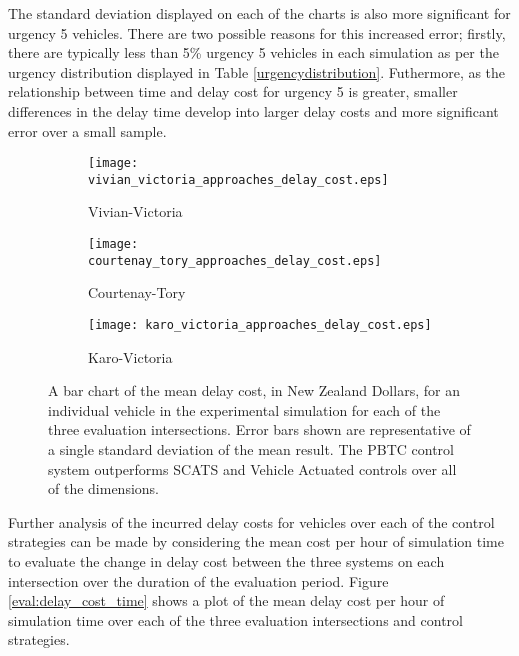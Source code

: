  The standard deviation displayed on each of the charts is also more significant for urgency 5 vehicles. There are two possible reasons for this increased error; firstly, there are typically less than 5\% urgency 5 vehicles in each simulation as per the urgency distribution displayed in Table \ref{urgencydistribution}. Futhermore, as the relationship between time and delay cost for urgency 5 is greater, smaller differences in the delay time develop into larger delay costs and more significant error over a small sample.
 
\begin{figure}
\centering
\begin{subfigure}{.5\textwidth}
  \centering
  \texttt{[image: vivian\_victoria\_approaches\_delay\_cost.eps]}
  \caption{Vivian-Victoria}
  \label{approaches_delay_cost:sub1}
\end{subfigure}%
\begin{subfigure}{.5\textwidth}
  \centering
  \texttt{[image: courtenay\_tory\_approaches\_delay\_cost.eps]}
  \caption{Courtenay-Tory}
  \label{approaches_delay_cost:sub2}
\end{subfigure}

\vspace{1cm}

\begin{subfigure}{.5\textwidth}
  \centering
  \texttt{[image: karo\_victoria\_approaches\_delay\_cost.eps]}
  \caption{Karo-Victoria}
  \label{approaches_delay_cost:sub3}
\end{subfigure}%
\caption[Results of measuring the mean delay cost incurred by individual vehicles for each evaluation control strategy and intersection.]{ A bar chart of the mean delay cost, in New Zealand Dollars, for an individual vehicle in the experimental simulation for each of the three evaluation intersections. Error bars shown are representative of a single standard deviation of the mean result. The PBTC control system outperforms SCATS and Vehicle Actuated controls over all of the dimensions.  }
\label{eval:approaches_delay_cost}
\end{figure}

Further analysis of the incurred delay costs for vehicles over each of the control strategies can be made by considering the mean cost per hour of simulation time to evaluate the change in delay cost between the three systems on each intersection over the duration of the evaluation period. Figure \ref{eval:delay_cost_time} shows a plot of the mean delay cost per hour of simulation time over each of the three evaluation intersections and control strategies. 

